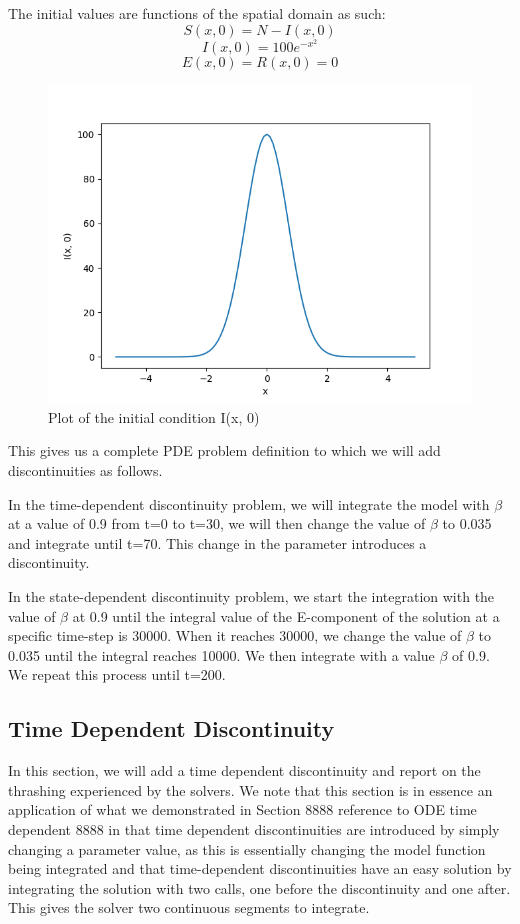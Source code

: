 \documentclass{article}
\begin{document}
The initial values are functions of the spatial domain as such:
\begin{equation}
S(x, 0) = N - I(x, 0)
\end{equation}
\begin{equation}
I(x, 0) = 100e^{-x^2}
\end{equation}
\begin{equation}
E(x, 0) = R(x, 0) = 0
\end{equation}

\begin{figure}[H]
\centering
\includegraphics[width=0.7\linewidth]{./figures/pde_I_0}
\caption{Plot of the initial condition I(x, 0)}
\label{fig:pde_I_0}
\end{figure}

This gives us a complete PDE problem definition to which we will add discontinuities as follows. 

In the time-dependent discontinuity problem, we will integrate the model with $\beta$ at a value of 0.9 from t=0 to t=30, we will then change the value of $\beta$ to 0.035 and integrate until t=70. This change in the parameter introduces a discontinuity.

In the state-dependent discontinuity problem, we start the integration with the value of $\beta$ at 0.9 until the integral value of the E-component of the solution at a specific time-step is 30000. When it reaches 30000, we change the value of $\beta$ to 0.035 until the integral reaches 10000. We then integrate with a value $\beta$ of 0.9. We repeat this process until t=200.

\subsection{Time Dependent Discontinuity}
\label{subsection:pde_time_intro}
In this section, we will add a time dependent discontinuity and report on the thrashing experienced by the solvers. We note that this section is in essence an application of what we demonstrated in Section 8888 reference to ODE time dependent 8888 in that time dependent discontinuities are introduced by simply changing a parameter value, as this is essentially changing the model function being integrated and that time-dependent discontinuities have an easy solution by integrating the solution with two calls, one before the discontinuity and one after. This gives the solver two continuous segments to integrate.
\end{document}
